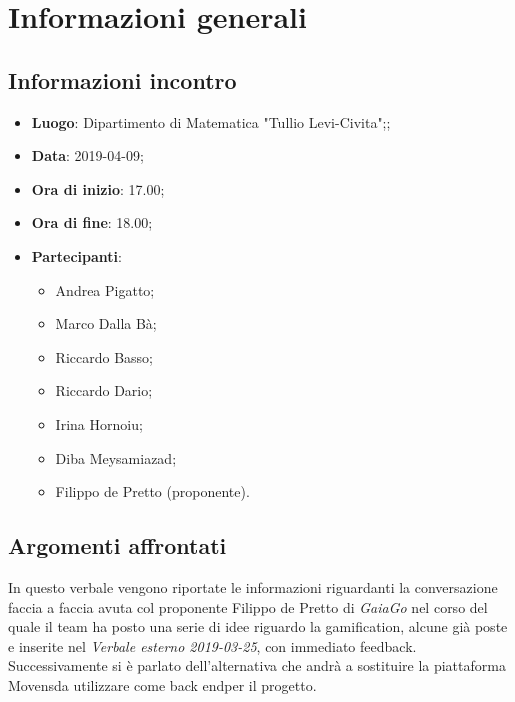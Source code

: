 \section{Informazioni generali}

\subsection{Informazioni incontro}
\begin{itemize}
\item \textbf{Luogo}: Dipartimento di Matematica "Tullio Levi-Civita";;
\item \textbf{Data}: 2019-04-09;
\item \textbf{Ora di inizio}: 17.00;
\item \textbf{Ora di fine}: 18.00;
\item \textbf{Partecipanti}: 
\begin{itemize}
	\item Andrea Pigatto;
	\item Marco Dalla Bà;
	\item Riccardo Basso;
	\item Riccardo Dario;
	\item Irina Hornoiu;
	\item Diba Meysamiazad;
	\item Filippo de Pretto (proponente).
\end{itemize}
\end{itemize}

\subsection{Argomenti affrontati}
In questo verbale vengono riportate le informazioni riguardanti la conversazione faccia a faccia avuta col proponente Filippo de Pretto di \textit{GaiaGo} nel corso del quale il team ha posto una serie di idee riguardo la gamification\glo, alcune già poste e inserite nel \textit{Verbale esterno 2019-03-25}, con immediato feedback. Successivamente si è parlato dell'alternativa che andrà a sostituire la piattaforma Movens\glosp da utilizzare come back end\glosp per il progetto.
